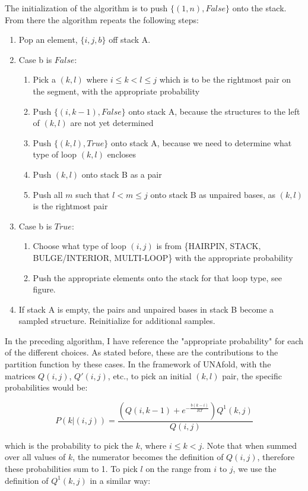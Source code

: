 The initialization of the algorithm is to push $\{(1, n), False\}$
onto the stack. From there the algorithm repeats the following steps:

\begin{enumerate}
\item Pop an element, $\{i, j, b\}$ off stack A.
\item Case b is $False$:
\begin{enumerate}
\item Pick a $(k, l)$ where $i \leq k < l \leq j$ which is to be the rightmost pair on the segment, with the appropriate probability
\item Push $\{(i, k-1), False\}$ onto stack A, because the structures to the left of $(k,l)$ are not yet determined
\item Push $\{(k, l), True\}$ onto stack A, because we need to determine what type of loop $(k,l)$ encloses
\item Push $(k,l)$ onto stack B as a pair
\item Push all $m$ such  that $l < m \leq j$ onto stack B as unpaired bases, as $(k,l)$ is the rightmost pair
\end{enumerate}
\item Case b is $True$:
\begin{enumerate}
\item Choose what type of loop $(i,j)$ is from \{HAIRPIN, STACK, BULGE/INTERIOR, MULTI-LOOP\} with the appropriate probability
\item Push the appropriate elements onto the stack for that loop type, see figure.
\end{enumerate}
\item If stack A is empty, the pairs and unpaired bases in stack B become a sampled structure. Reinitialize for additional samples.
\end{enumerate}

In the preceding algorithm, I have reference the "appropriate
probability" for each of the different choices. As stated before,
these are the contributions to the partition function by these
cases. In the framework of UNAfold, with the matrices $Q(i,j)$,
$Q'(i,j)$, etc., to pick an initial $(k,l)$ pair, the specific
probabilities would be:

\begin{equation}
P(k | (i,j)) = \frac{\left ( Q(i, k-1) + e^{-\frac{b(k-i)}{RT} }\right ) Q^1(k, j)}{Q(i,j)}
\end{equation}

which is the probability to pick the $k$, where $i \leq k < j$. Note
that when summed over all values of $k$, the numerator becomes the
definition of $Q(i,j)$, therefore these probabilities sum to 1. To
pick $l$ on the range from $i$ to $j$, we use the definition of
$Q^1(k, j)$ in a similar way:

